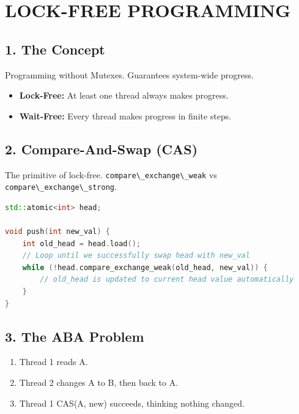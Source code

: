 \hypertarget{lock-free-programming}{%
\chapter{LOCK-FREE PROGRAMMING}\label{lock-free-programming}}

\hypertarget{the-concept}{%
\section{1. The Concept}\label{the-concept}}

Programming without Mutexes. Guarantees system-wide progress.

\begin{itemize}
\tightlist
\item
  \textbf{Lock-Free:} At least one thread always makes progress.
\item
  \textbf{Wait-Free:} Every thread makes progress in finite steps.
\end{itemize}

\hypertarget{compare-and-swap-cas}{%
\section{2. Compare-And-Swap (CAS)}\label{compare-and-swap-cas}}

The primitive of lock-free.
\passthrough{\lstinline!compare\_exchange\_weak!} vs
\passthrough{\lstinline!compare\_exchange\_strong!}.

\begin{lstlisting}[language={C++}]
std::atomic<int> head;

void push(int new_val) {
    int old_head = head.load();
    // Loop until we successfully swap head with new_val
    while (!head.compare_exchange_weak(old_head, new_val)) {
        // old_head is updated to current head value automatically
    }
}
\end{lstlisting}

\hypertarget{the-aba-problem}{%
\section{3. The ABA Problem}\label{the-aba-problem}}

\begin{enumerate}
\def\labelenumi{\arabic{enumi}.}
\tightlist
\item
  Thread 1 reads A.
\item
  Thread 2 changes A to B, then back to A.
\item
  Thread 1 CAS(A, new) succeeds, thinking nothing changed.
\end{enumerate}

